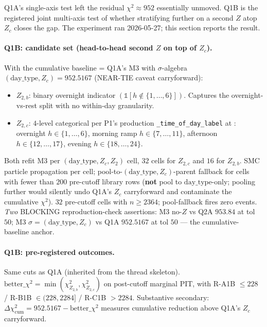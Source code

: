 \documentclass[11pt]{article}
\theoremstyle{definition}
\theoremstyle{plain}
\begin{document}
Q1A's single-axis test left the residual $\chi^2 \approx 952$
essentially unmoved. Q1B is the registered joint multi-axis test
of whether stratifying further on a second $Z$ atop $Z_c$ closes
the gap. The experiment ran 2026-05-27; this section reports the
result.

\paragraph{Q1B: candidate set (head-to-head second $Z$ on top of
$Z_c$).}
With the cumulative baseline = Q1A's M3 with $\sigma$-algebra
$(\mathrm{day\_type}, Z_c) = 952.5167$ (NEAR-TIE caveat carryforward):
\begin{itemize}[leftmargin=2em]
\item $Z_{2,b}$: binary overnight indicator
$(\mathbb{1}[h \notin \{1, \ldots, 6\}])$. Captures the
overnight-vs-rest split with no within-day granularity.
\item $Z_{2,c}$: $4$-level categorical per P1's production
\verb|_time_of_day_label| at
: overnight
$h \in \{1, \ldots, 6\}$, morning ramp $h \in \{7, \ldots, 11\}$,
afternoon $h \in \{12, \ldots, 17\}$, evening $h \in \{18, \ldots, 24\}$.
\end{itemize}
Both refit M3 per
$(\mathrm{day\_type}, Z_c, Z_2)$ cell, $32$ cells for $Z_{2,c}$
and $16$ for $Z_{2,b}$. SMC particle propagation per cell;
pool-to-$(\mathrm{day\_type}, Z_c)$-parent fallback for cells with
fewer than $200$ pre-cutoff library rows (\textbf{not} pool to
$\mathrm{day\_type}$-only; pooling further would silently undo
Q1A's $Z_c$ carryforward and contaminate the cumulative $\chi^2$).
$32$ pre-cutoff cells with $n \ge 2364$; pool-fallback fires zero
events. \emph{Two} BLOCKING reproduction-check assertions: M3
no-$Z$ vs Q2A $953.84$ at tol $50$; M3 $\sigma = (\mathrm{day\_type},
Z_c)$ vs Q1A $952.5167$ at tol $50$ --- the cumulative-baseline
anchor.

\paragraph{Q1B: pre-registered outcomes.}
Same cuts as Q1A (inherited from the thread skeleton).
$\mathrm{better}\_\chi^2 = \min(\chi^2_{Z_{2,b}}, \chi^2_{Z_{2,c}})$
on post-cutoff marginal PIT, with R-A1B $\le 228$ / R-B1B $\in
(228, 2284]$ / R-C1B $> 2284$. Substantive secondary:
$\Delta\chi^2_{\mathrm{cum}} = 952.5167 - \mathrm{better}\_\chi^2$
measures cumulative reduction above Q1A's $Z_c$ carryforward.
\end{document}
